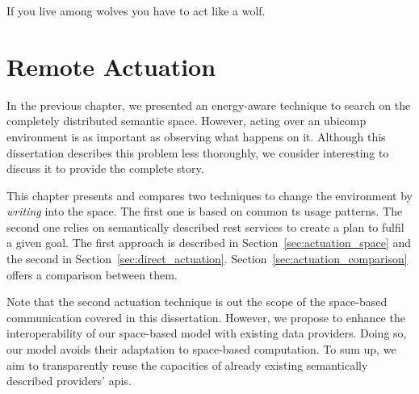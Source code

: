 
\begin{savequote}[50mm]
If you live among wolves you have to act like a wolf.
\end{savequote}


\chapter{Remote Actuation}
\label{cha:actuate}


\newcommand{\restdesc}{\emph{RESTdesc}}



\ifpdf
    \graphicspath{{\pathchapsix/figures/PNG/}{\pathchapsix/figures/PDF/}{\pathchapsix/figures/JPG/}{\pathchapsix/figures/}}
\else
    \graphicspath{{\pathchapsix/figures/EPS/}{\pathchapsix/figures/}}
\fi



In the previous chapter, we presented an energy-aware technique to search on the completely distributed semantic space.
However, acting over an \ac{ubicomp} environment is as important as observing what happens on it.
Although this dissertation describes this problem less thoroughly, we consider interesting to discuss it to provide the complete story. %


This chapter presents and compares two techniques to change the environment by \emph{writing} into the space. %
The first one is based on common \ac{ts} usage patterns.
The second one relies on semantically described \ac{rest} services to create a plan to fulfil a given goal.
The first approach is described in Section~\ref{sec:actuation_space} and the second in Section~\ref{sec:direct_actuation}.
Section~\ref{sec:actuation_comparison} offers a comparison between them.


Note that the second actuation technique is out the scope of the space-based communication covered in this dissertation.
However, we propose to enhance the interoperability of our space-based model with existing data providers.
Doing so, our model avoids their adaptation to space-based computation. %
To sum up, we aim to transparently reuse the capacities of already existing semantically described providers' \acsp{api}.


